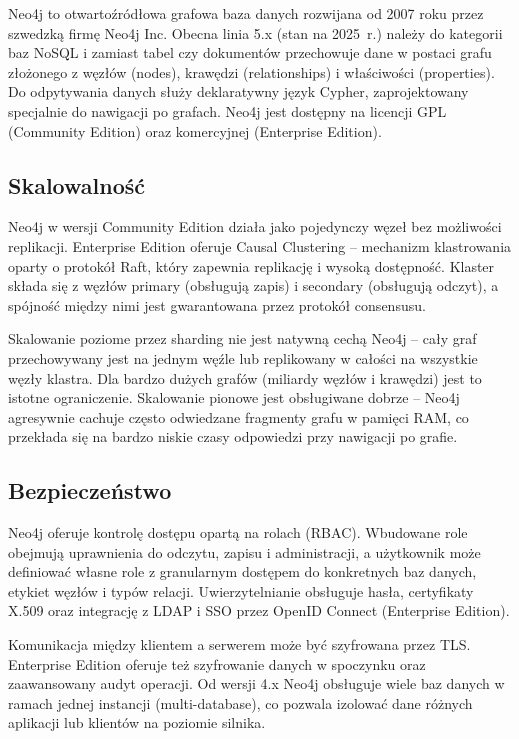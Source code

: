 Neo4j to otwartoźródłowa grafowa baza danych rozwijana od 2007 roku przez
szwedzką firmę Neo4j Inc. Obecna linia 5.x (stan na 2025~r.) należy do
kategorii baz NoSQL i zamiast tabel czy dokumentów przechowuje dane w postaci
grafu złożonego z węzłów (nodes), krawędzi (relationships) i właściwości
(properties). Do odpytywania danych służy deklaratywny język Cypher,
zaprojektowany specjalnie do nawigacji po grafach. Neo4j jest dostępny
na licencji GPL (Community Edition) oraz komercyjnej (Enterprise Edition).

\subsection{Skalowalność}

Neo4j w wersji Community Edition działa jako pojedynczy węzeł bez możliwości
replikacji. Enterprise Edition oferuje Causal Clustering -- mechanizm
klastrowania oparty o protokół Raft, który zapewnia replikację i wysoką
dostępność. Klaster składa się z węzłów primary (obsługują zapis) i secondary
(obsługują odczyt), a spójność między nimi jest gwarantowana przez protokół
consensusu.

Skalowanie poziome przez sharding nie jest natywną cechą Neo4j -- cały graf
przechowywany jest na jednym węźle lub replikowany w całości na wszystkie
węzły klastra. Dla bardzo dużych grafów (miliardy węzłów i krawędzi) jest
to istotne ograniczenie. Skalowanie pionowe jest obsługiwane dobrze -- Neo4j
agresywnie cachuje często odwiedzane fragmenty grafu w pamięci RAM, co
przekłada się na bardzo niskie czasy odpowiedzi przy nawigacji po grafie.

\subsection{Bezpieczeństwo}

Neo4j oferuje kontrolę dostępu opartą na rolach (RBAC). Wbudowane role
obejmują uprawnienia do odczytu, zapisu i administracji, a użytkownik może
definiować własne role z granularnym dostępem do konkretnych baz danych,
etykiet węzłów i typów relacji. Uwierzytelnianie obsługuje hasła, certyfikaty
X.509 oraz integrację z LDAP i SSO przez OpenID Connect (Enterprise Edition).

Komunikacja między klientem a serwerem może być szyfrowana przez TLS.
Enterprise Edition oferuje też szyfrowanie danych w spoczynku oraz
zaawansowany audyt operacji. Od wersji 4.x Neo4j obsługuje wiele baz danych
w ramach jednej instancji (multi-database), co pozwala izolować dane różnych
aplikacji lub klientów na poziomie silnika.

